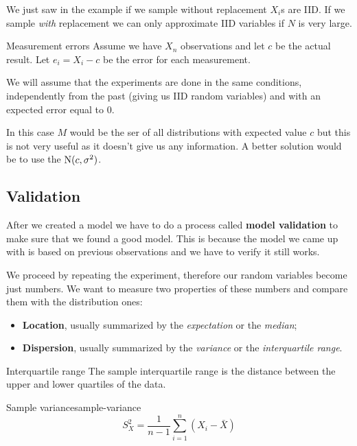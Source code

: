 \documentclass[12pt]{extarticle}
\newcommand{\Normal}{{\operatorfont N}}
\begin{document}
We just saw in the example if we sample without replacement $X_i$s are IID.
If we sample \textit{with} replacement we can only approximate IID variables if $N$ is very large.

\begin{example}{Measurement errors}{}
	Assume we have $X_n$ observations and let $c$ be the actual result.
	Let $e_i = X_i - c$ be the error for each measurement.

	We will assume that the experiments are done in the same conditions, independently from the past (giving us IID random variables) and with an expected error equal to $0$.

	In this case $M$ would be the ser of all distributions with expected value $c$ but this is not very useful as it doesn't give us any information.
	A better solution would be to use the $\Normal(c, \sigma^2)$.
\end{example}

\subsection{Validation}

After we created a model we have to do a process called \textbf{model validation} to make sure that we found a good model.
This is because the model we came up with is based on previous observations and we have to verify it still works.

We proceed by repeating the experiment, therefore our random variables become just numbers. We want to measure two properties of these numbers and compare them with the distribution ones:
\begin{itemize}
	\item \textbf{Location}, usually summarized by the \textit{expectation} or the \textit{median};
	\item \textbf{Dispersion}, usually summarized by the \textit{variance} or the \textit{interquartile range}.
\end{itemize}

\begin{remark}{Interquartile range}{}
	The sample interquartile range is the distance between the upper and lower quartiles of the data.
\end{remark}

\begin{definition}{Sample variance}{sample-variance}
	\begin{equation}
		S_X^2 = \frac{1}{n-1} \sum^n_{i = 1}(X_i - \bar X)
	\end{equation}
\end{definition}
\end{document}

